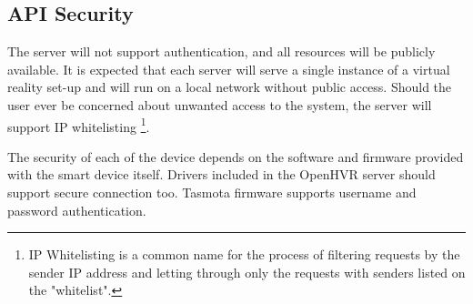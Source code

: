 \hypertarget{x-api-security}{\subsection*{API Security}}
The server will not support authentication, and all resources will be publicly
available. It is expected that each server will serve a single instance of
a virtual reality set-up and will run on a local network without public access.
Should the user ever be concerned about unwanted access to the system, the server
will support IP whitelisting
\footnote{IP Whitelisting is a common name for the process of filtering requests by the sender IP address and letting through only the requests with senders listed on the "whitelist".}.


The security of each of the device depends on the software and firmware provided
with the smart device itself. Drivers included in the OpenHVR server should
support secure connection too. Tasmota firmware supports username and
password authentication.
